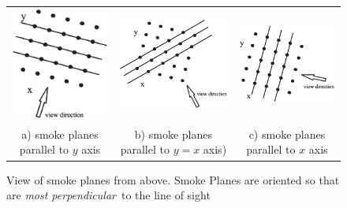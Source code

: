 \documentclass[11pt,twoside]{book}
\begin{document}
\begin{figure}
\begin{tabular}{ccc}
\includegraphics[width=2.0in]{figures/figDIRA2}&
\includegraphics[width=2.0in]{figures/figDIRA3}&
\includegraphics[width=2.0in]{figures/figDIRA1}\\
a) smoke planes parallel to $y$ axis& b) smoke planes parallel to
$y=x$ axis)&
c) smoke planes parallel to $x$ axis\\
\end{tabular}
\caption{View of smoke planes from above.  Smoke Planes are
oriented so that are {\em most perpendicular}\ to the line of sight }
\label{figDIRA}
\end{figure}
\end{document}
